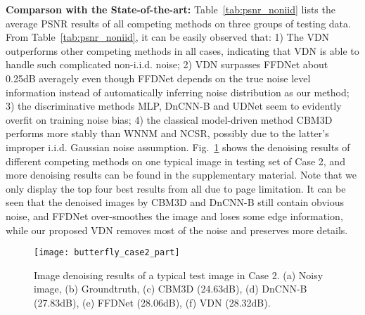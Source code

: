 \documentclass{article}
\begin{document}
\textbf{Comparson with the State-of-the-art:}
Table~\ref{tab:psnr_noniid} lists the average PSNR results of all competing methods on three groups of testing data.
From Table~\ref{tab:psnr_noniid}, it can be easily observed that: 1) The VDN outperforms
other competing methods in all cases, indicating that VDN is able to handle such
complicated non-i.i.d. noise; 2) VDN surpasses FFDNet about 0.25dB averagely even though
FFDNet depends on the true noise level information instead of automatically inferring noise
distribution as our method;
3) the discriminative methods MLP, DnCNN-B and UDNet seem to evidently overfit on training noise bias;
4) the classical model-driven method CBM3D performs more stably than WNNM and NCSR, possibly due to the latter's
improper i.i.d. Gaussian
noise assumption. Fig.~\ref{fig:butterfly_case2} shows the denoising results of different competing methods on
one typical image in testing set of Case 2, and more denoising results can be found in the supplementary material.
Note that we only display the top four best results from all due to page limitation. It can be seen
that the denoised images by CBM3D and DnCNN-B still contain obvious noise, and FFDNet over-smoothes the image and
loses some edge information, while our proposed VDN removes most of the noise and preserves more details.
\begin{figure}[t]
    \centering
    \texttt{[image: butterfly\_case2\_part]}
    \vspace{-3mm}
    \caption{\small{Image denoising results of a typical test image in Case 2. (a) Noisy image, (b) Groundtruth,
    (c) CBM3D (24.63dB), (d) DnCNN-B (27.83dB), (e) FFDNet (28.06dB), (f) VDN (28.32dB).}}
    \label{fig:butterfly_case2} 
\end{figure}
\end{document}
